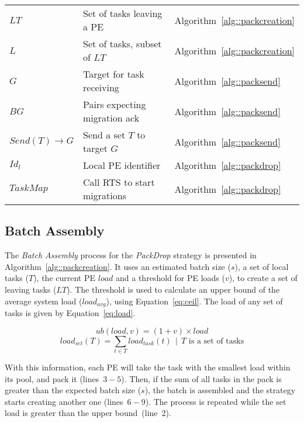 \begin{table}
\begin{tabular}{l | l | l }
		$LT$				& Set of tasks leaving a PE 							& Algorithm~\ref{alg::packcreation} \\
		$L$				& Set of tasks, subset of $LT$						& Algorithm~\ref{alg::packcreation} \\
		$G$				& Target for task receiving							& Algorithm~\ref{alg::packsend} \\
		$BG$				& Pairs expecting migration ack						& Algorithm~\ref{alg::packsend} \\ 
		$Send(T)\rightarrow G $ & Send a set $T$ to target $G$				& Algorithm~\ref{alg::packsend} \\ 
		$Id_l$ 			& Local PE identifier								& Algorithm~\ref{alg::packdrop} \\
		$TaskMap$		& Call RTS to start migrations						& Algorithm~\ref{alg::packdrop} \\
	\end{tabular}
	\label{tab:algo:symbols}
\end{table}

\subsection{Batch Assembly} \label{sec:algo:creation}

The \textit{Batch Assembly} process for the \textit{PackDrop} strategy is presented in Algorithm~\ref{alg::packcreation}.
It uses an estimated batch size ($s$), a set of local tasks ($T$), the current PE $load$ and a threshold for PE loads ($v$), to create a set of leaving tasks ($LT$).
The threshold is used to calculate an upper bound of the average system load ($load_{avg}$), using Equation~\ref{eq:ceil}. 
The load of any set of tasks is given by Equation~\ref{eq:load}.

\begin{equation}
	ub(load,v) = (1+v)\times load
    \label{eq:ceil}
\end{equation}
\begin{equation}
	load_{set}(T) = \sum_{t \in T}{load_{task}(t)}\ \ |\ \ T \text{ is a set of tasks}
	\label{eq:load}
\end{equation}

With this information, each PE will take the task with the smallest load within its pool, and pack it (lines~$3-5$).
Then, if the sum of all tasks in the pack is greater than the expected batch size ($s$), the batch is assembled and the strategy starts creating another one (lines~$6-9$).
The process is repeated while the set load is greater than the upper bound~(line~$2$).

